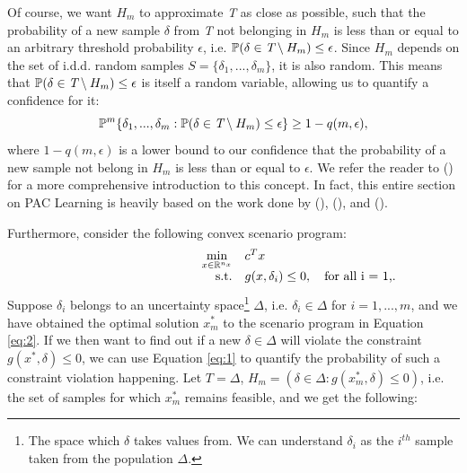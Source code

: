 \documentclass[11pt]{article}
\begin{document}
Of course, we want $H_{m}$ to approximate \emph{T} as close as possible, such that the probability of a new sample $\delta$ from \emph{T} not belonging in $H_{m}$ is less than or equal to an arbitrary threshold probability $\epsilon$, i.e. $\mathbb{P}(\delta \in \emph{T} \setminus H_{m}) \leq \epsilon$. Since $H_{m}$ depends on the set of i.d.d. random samples $S = \{\delta_{1},...,\delta_{m}\}$, it is also random. This means that $\mathbb{P}(\delta \in \emph{T} \setminus H_{m}) \leq \epsilon$ is itself a random variable, allowing us to quantify a confidence for it:
\begin{equation}
	\label{eq:1}
	\mathbb{P}^{m} \{\delta_{1},...,\delta_{m}: \mathbb{P}(\delta \in \emph{T} \setminus H_{m}) \leq \epsilon \} \geq 1 - q(m,\epsilon),
\end{equation}
where $1 - q(m,\epsilon)$ is a lower bound to our confidence that the probability of a new sample not belong in $H_{m}$ is less than or equal to $\epsilon$. We refer the reader to (\cite{paclearning1}) for a more comprehensive introduction to this concept. In fact, this entire section on PAC Learning is heavily based on the work done by (\cite{paclearning1}), (\cite{romao2021tight}), and (\cite{kostas}).

Furthermore, consider the following convex scenario program:
\begin{equation}
	\label{eq:2}
	\begin{array}{rrclcl}
	\displaystyle \min_{x \in \mathbb{R}^{n_{x}}} & \multicolumn{3}{l}{c^{T}x}\\
	\text{s.t.} & g(x,\delta_{i}) \leq 0, \quad \text{for all i = 1,...,m}.\\
	\end{array}
	\end{equation}
Suppose $\delta_{i}$ belongs to an uncertainty space\footnote{The space which $\delta$ takes values from. We can understand $\delta_{i}$ as the $i^{th}$ sample taken from the population $\Delta$.} $\Delta$, i.e. $\delta_{i} \in \Delta$ for $i = 1,...,m$, and we have obtained the optimal solution $x^{*}_{m}$ to the scenario program in Equation \ref{eq:2}. If we then want to find out if a new $\delta\in \Delta$ will violate the constraint $g(x^{*},\delta) \leq 0$, we can use Equation \ref{eq:1} to quantify the probability of such a constraint violation happening. Let $T=\Delta$, $H_{m} = (\delta \in \Delta: g(x^{*}_{m},\delta) \leq 0)$, i.e. the set of samples for which $x^{*}_{m}$ remains feasible, and we get the following:
\end{document}
